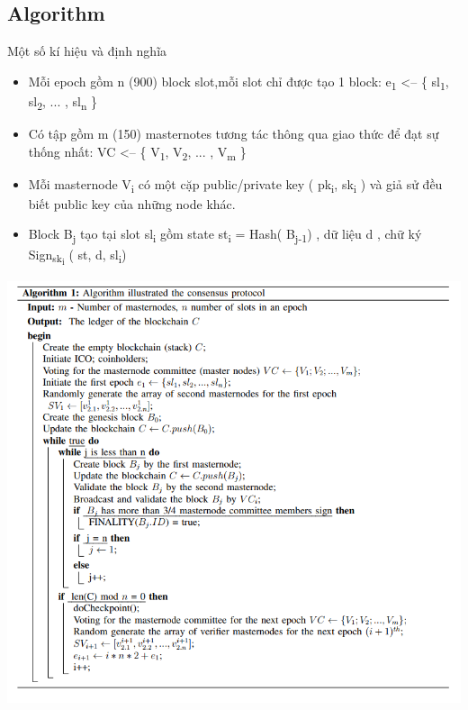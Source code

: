 \documentclass[12pt,a4paper]{article}
\begin{document}
		\subsection{Algorithm}
		Một số kí hiệu và định nghĩa
		\begin{itemize}		
			\item Mỗi epoch gồm n (900) block slot,mỗi slot chỉ được tạo 1 block: e\textsubscript{1} <-- \{ sl\textsubscript{1}, sl\textsubscript{2}, ... , sl\textsubscript{n} \}
			\item Có tập gồm m (150) masternotes tương tác thông qua giao thức để đạt sự thống nhất: VC <-- \{ V\textsubscript{1}, V\textsubscript{2}, ... , V\textsubscript{m} \}
			\item Mỗi masternode V\textsubscript{i} có một cặp public/private key ( pk\textsubscript{i}, sk\textsubscript{i} ) và giả sử đều biết public key của những node khác.
			\item Block B\textsubscript{j} tạo tại slot sl\textsubscript{i} gồm state st\textsubscript{i} = Hash(
B\textsubscript{j-1}) , dữ liệu d , chữ ký Sign\textsubscript{sk\textsubscript{i}} ( st, d, sl\textsubscript{i})		
		\end{itemize}
		\begin{center}
			\includegraphics[width=\linewidth]{algo.png} 
		\end{center}
\end{document}
